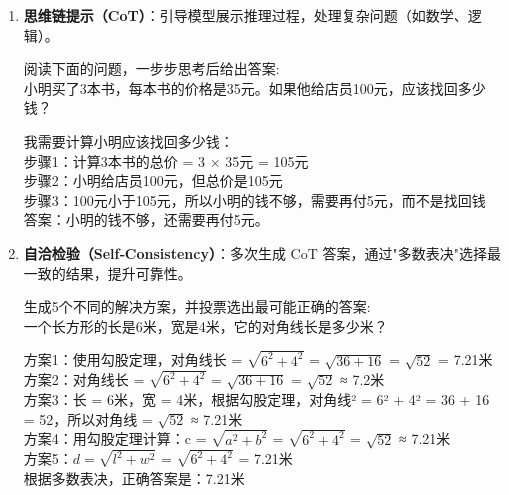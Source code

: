 \documentclass[12pt]{ctexart}
\begin{document}
\begin{enumerate}[label=\arabic*.]
  \item \textbf{思维链提示（CoT）}：引导模型展示推理过程，处理复杂问题（如数学、逻辑）。
  \begin{promptbox}
  阅读下面的问题，一步步思考后给出答案:\\
  小明买了3本书，每本书的价格是35元。如果他给店员100元，应该找回多少钱？
  \end{promptbox}
  \begin{outputbox}
  我需要计算小明应该找回多少钱：\\
  步骤1：计算3本书的总价 = 3 × 35元 = 105元\\
  步骤2：小明给店员100元，但总价是105元\\
  步骤3：100元小于105元，所以小明的钱不够，需要再付5元，而不是找回钱\\
  答案：小明的钱不够，还需要再付5元。
  \end{outputbox}
  
  \item \textbf{自洽检验（Self‑Consistency）}：多次生成 CoT 答案，通过"多数表决"选择最一致的结果，提升可靠性。
  \begin{promptbox}
  生成5个不同的解决方案，并投票选出最可能正确的答案:\\
  一个长方形的长是6米，宽是4米，它的对角线长是多少米？
  \end{promptbox}
  \begin{outputbox}
  方案1：使用勾股定理，对角线长 = $\sqrt{6^2 + 4^2}$ = $\sqrt{36 + 16}$ = $\sqrt{52}$ = 7.21米\\
  方案2：对角线长 = $\sqrt{6^2 + 4^2}$ = $\sqrt{36 + 16}$ = $\sqrt{52}$ ≈ 7.2米\\
  方案3：长 = 6米，宽 = 4米，根据勾股定理，对角线² = 6² + 4² = 36 + 16 = 52，所以对角线 = $\sqrt{52}$ ≈ 7.21米\\
  方案4：用勾股定理计算：c = $\sqrt{a^2 + b^2}$ = $\sqrt{6^2 + 4^2}$ = $\sqrt{52}$ ≈ 7.21米\\
  方案5：$d = \sqrt{l^2 + w^2}$ = $\sqrt{6^2 + 4^2}$ = 7.21米\\
  
  根据多数表决，正确答案是：7.21米
  \end{outputbox}
  

\end{enumerate}
\end{document}
